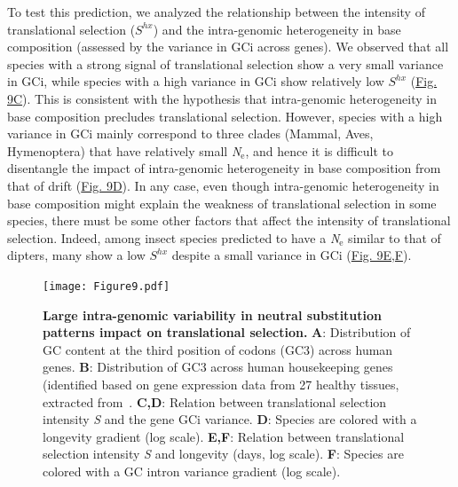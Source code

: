 To test this prediction, we analyzed the relationship between the intensity of translational selection ($S^{hx}$) and the intra-genomic heterogeneity in base composition (assessed by the variance in GCi across genes). We observed that all species with a strong signal of translational selection show a very small variance in GCi, while species with a high variance in GCi show relatively low $S^{hx}$ (\hyperref[fig:CU9]{Fig. 9C}). This is consistent with the hypothesis that intra-genomic heterogeneity in base composition precludes translational selection. However, species with a high variance in GCi mainly correspond to three clades (Mammal, Aves, Hymenoptera) that have relatively small \textit{N}$_{\text{e}}$, and hence it is difficult to disentangle the impact of intra-genomic heterogeneity in base composition from that of drift (\hyperref[fig:CU9]{Fig. 9D}). 
In any case, even though intra-genomic heterogeneity in base composition might explain the weakness of translational selection in some species, there must be some other factors that affect the intensity of translational selection. Indeed, among insect species predicted to have a \textit{N}$_{\text{e}}$ similar to that of dipters, many show a low $S^{hx}$ despite a small variance in GCi (\hyperref[fig:CU9]{Fig. 9E,F}). 


\begin{figure}[t]   
    \begin{center}
        \texttt{[image: Figure9.pdf]}
    \end{center}                                                                       
    \caption[Large intra-genomic variability in neutral substitution patterns impact on translational selection]{\textbf{Large intra-genomic variability in neutral substitution patterns impact on translational selection.} \textbf{A}: Distribution of GC content at the third position of codons (GC3) across human genes. \textbf{B}: Distribution of GC3 across human housekeeping genes (identified based on gene expression data from 27 healthy tissues, extracted from~\citep{pouyet_recombination_2017}. \textbf{C,D}: Relation between translational selection intensity \textit{S} and the gene GCi variance. \textbf{D}: Species are colored with a longevity gradient (log scale). \textbf{E,F}: Relation between translational selection intensity \textit{S} and longevity (days, log scale). \textbf{F}: Species are colored with a GC intron variance gradient (log scale).}
    \label{fig:CU9}
\end{figure}





